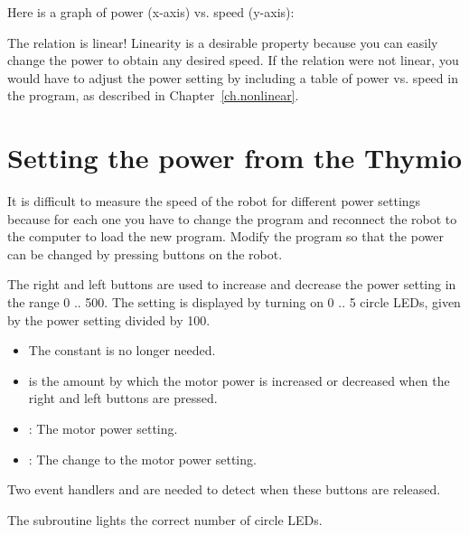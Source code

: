 Here is a graph of power (x-axis) vs. speed (y-axis):


The relation is linear! Linearity is a desirable property because you
can easily change the power to obtain any desired speed. If the relation
were not linear, you would have to adjust the power setting by including
a table of power vs. speed in the program, as described in
Chapter~\ref{ch.nonlinear}.

\section{Setting the power from the Thymio}


It is difficult to measure the speed of the robot for different power
settings because for each one you have to change the program and
reconnect the robot to the computer to load the new program. Modify the
program so that the power can be changed by pressing buttons on the
robot.


The right and left buttons are used to increase and decrease the power
setting in the range 0 .. 500. The setting is displayed by turning on 0
.. 5 circle LEDs, given by the power setting divided by 100.


\begin{itemize}
\item The constant  is no longer needed.
\item {} is the amount by which the motor power is increased
or decreased when the right and left buttons are pressed.
\end{itemize}


\begin{itemize}
\item {}: The motor power setting.
\item {}: The change to the motor power setting.
\end{itemize}



Two event handlers  and  are needed to
detect when these buttons are released.

The subroutine  lights the correct number of
circle LEDs.

